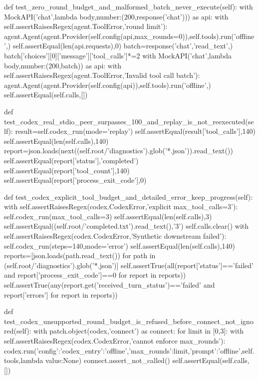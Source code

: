     def test_zero_round_budget_and_malformed_batch_never_execute(self):
        with MockAPI('chat',lambda body,number:(200,response('chat'))) as api:
            with self.assertRaisesRegex(agent.ToolError,'round limit'):
                agent.Agent(agent.Provider(self.config(api,max_rounds=0)),self.tools).run('offline',{})
            self.assertEqual(len(api.requests),0)
        batch=response('chat','read_text',{})
        batch['choices'][0]['message']['tool_calls']*=2
        with MockAPI('chat',lambda body,number:(200,batch)) as api:
            with self.assertRaisesRegex(agent.ToolError,'Invalid tool call batch'):
                agent.Agent(agent.Provider(self.config(api)),self.tools).run('offline',{})
            self.assertEqual(self.calls,[])

    def test_codex_real_stdio_peer_surpasses_100_and_replay_is_not_reexecuted(self):
        result=self.codex_run(mode='replay')
        self.assertEqual(result['tool_calls'],140)
        self.assertEqual(len(self.calls),140)
        report=json.loads(next((self.root/'diagnostics').glob('*.json')).read_text())
        self.assertEqual(report['status'],'completed')
        self.assertEqual(report['tool_count'],140)
        self.assertEqual(report['process_exit_code'],0)

    def test_codex_explicit_tool_budget_and_detailed_error_keep_progress(self):
        with self.assertRaisesRegex(codex.CodexError,'explicit max_tool_calls=3'):
            self.codex_run(max_tool_calls=3)
        self.assertEqual(len(self.calls),3)
        self.assertEqual((self.root/'completed.txt').read_text(),'3')
        self.calls.clear()
        with self.assertRaisesRegex(codex.CodexError,'Synthetic downstream failed'):
            self.codex_run(steps=140,mode='error')
        self.assertEqual(len(self.calls),140)
        reports=[json.loads(path.read_text()) for path in (self.root/'diagnostics').glob('*.json')]
        self.assertTrue(all(report['status']=='failed' and report['process_exit_code']==0 for report in reports))
        self.assertTrue(any(report.get('received_turn_status')=='failed' and report['errors'] for report in reports))

    def test_codex_unsupported_round_budget_is_refused_before_connect_not_ignored(self):
        with patch.object(codex,'connect') as connect:
            for limit in [0,3]:
                with self.assertRaisesRegex(codex.CodexError,'cannot enforce max_rounds'):
                    codex.run({'config':{'codex_entry':'offline','max_rounds':limit},'prompt':'offline'},self.tools,lambda value:None)
            connect.assert_not_called()
        self.assertEqual(self.calls,[])


